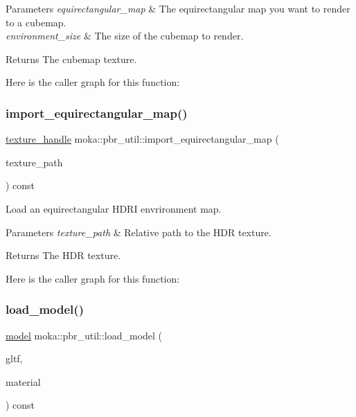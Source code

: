\begin{DoxyParams}{Parameters}
{\em equirectangular\+\_\+map} & The equirectangular map you want to render to a cubemap.\\
\hline
{\em environment\+\_\+size} & The size of the cubemap to render. \\
\hline
\end{DoxyParams}
\begin{DoxyReturn}{Returns}
The cubemap texture. 
\end{DoxyReturn}
Here is the caller graph for this function\+:
\mbox{\label{classmoka_1_1pbr__util_a108ca0e7337f7282e6928c133c0d2315}} 
\subsubsection{\texorpdfstring{import\_equirectangular\_map()}{import\_equirectangular\_map()}}
{\footnotesize\ttfamily \mbox{\hyperlink{structmoka_1_1texture__handle}{texture\+\_\+handle}} moka\+::pbr\+\_\+util\+::import\+\_\+equirectangular\+\_\+map (\begin{DoxyParamCaption}\item[{const std\+::filesystem\+::path \&}]{texture\+\_\+path }\end{DoxyParamCaption}) const}



Load an equirectangular H\+D\+RI envrironment map. 


\begin{DoxyParams}{Parameters}
{\em texture\+\_\+path} & Relative path to the H\+DR texture. \\
\hline
\end{DoxyParams}
\begin{DoxyReturn}{Returns}
The H\+DR texture. 
\end{DoxyReturn}
Here is the caller graph for this function\+:
\mbox{\label{classmoka_1_1pbr__util_a6284a2bd80b2007a9bd057cf809998c5}} 
\subsubsection{\texorpdfstring{load\_model()}{load\_model()}}
{\footnotesize\ttfamily \mbox{\hyperlink{classmoka_1_1model}{model}} moka\+::pbr\+\_\+util\+::load\+\_\+model (\begin{DoxyParamCaption}\item[{const std\+::filesystem\+::path \&}]{gltf,  }\item[{const std\+::filesystem\+::path \&}]{material }\end{DoxyParamCaption}) const}



